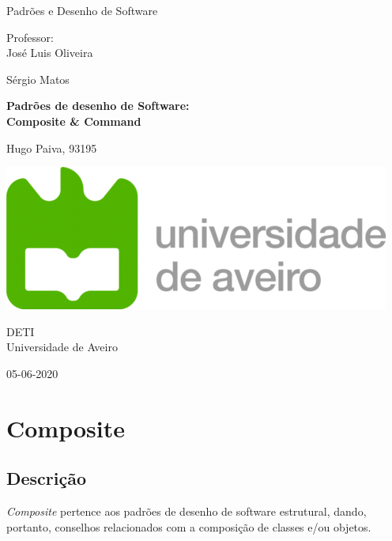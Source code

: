 \documentclass[10pt,portuguese]{article}
\begin{document}
\begin{titlepage}
	\clearpage\thispagestyle{empty}
	\centering
	\vspace{2cm}

	
	{\Large  Padrões e Desenho de Software \par}
	\vspace{0.5cm}
	{\small Professor: \\
	José Luis Oliveira\par
	Sérgio Matos\par}
	\vspace{4cm}
	{ \textbf{Padrões de desenho de Software:}} \\
	\vspace{0.5cm}
	{\Huge \textbf{Composite \& Command}} \\
	\vspace{1cm}
	\vspace{4cm}
	{\normalsize  Hugo Paiva, 93195
	   \par}
	 
	\vspace{2cm}

    \includegraphics[scale=0.20]{logo_ua.png}
    
    \vspace{2cm}
    
	{\normalsize DETI \\ 
		Universidade de Aveiro \par}
		
	{\normalsize 05-06-2020 \par}
	\vspace{2cm}
		
	
	\pagebreak

\end{titlepage}
\tableofcontents{}
\clearpage

\section{Composite}
\subsection{Descrição}
\par \textit{Composite} pertence aos padrões de desenho de software estrutural, dando, portanto, conselhos relacionados com a composição de classes e/ou objetos.
\end{document}
